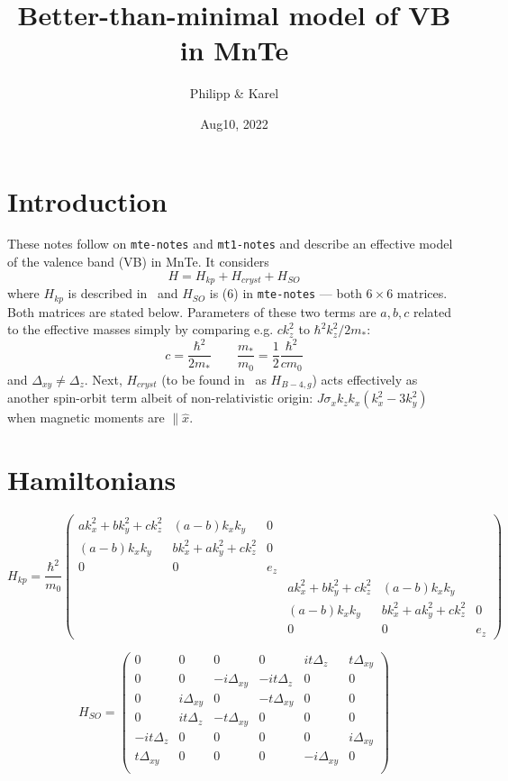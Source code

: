 \documentclass{article}
\title{Better-than-minimal model of VB in MnTe}
\author{Philipp \& Karel}
\date{Aug10, 2022}
\begin{document}
\maketitle

\section*{Introduction}

These notes follow on {\tt mte-notes} and {\tt mt1-notes} and describe
an effective model of the valence band (VB) in MnTe. It considers
%
\begin{equation}
  H=H_{kp}+H_{cryst}+H_{SO}
\label{eq-01}
\end{equation}
%
where $H_{kp}$ is described in~\cite{PFjr} and $H_{SO}$ is (6) in
{\tt mte-notes} --- both $6\times 6$ matrices. Both matrices are stated below. Parameters of these two
terms are $a,b,c$ related to the effective masses simply by comparing
e.g. $ck_z^2$ to $\hbar^2 k_z^2/2m_*$:
%
\begin{equation}
  c=\frac{\hbar^2}{2m_*}\qquad \frac{m_*}{m_0}={\textstyle{\frac12}} \frac{\hbar^2}{cm_0}
  \label{eq-02}
\end{equation}  
%
and $\Delta_{xy}\not=\Delta_z$. Next, $H_{cryst}$ (to be found in~\cite{LandT}
as $H_{B-4,g}$) acts effectively as another spin-orbit term albeit of
non-relativistic origin: $J\sigma_x k_zk_x(k_x^2-3k_y^2)$ when magnetic
moments are $\parallel \hat{x}$. 

\section*{Hamiltonians}
$$ H_{kp} = \frac{\hbar^2}{m_0} \begin{pmatrix}
	a k_x^2 + b k_y^2 + c k_z^2 & (a-b) k_x k_y & 0 & & &\\
	(a-b) k_x k_y & b k_x^2 + a k_y^2 + c k_z^2 & 0 & & & \\
	0 & 0 & e_z & & & \\
	& & & a k_x^2 + b k_y^2 + c k_z^2 & (a-b) k_x k_y \\
	& & & (a-b) k_x k_y & b k_x^2 + a k_y^2 + c k_z^2 & 0 \\
	& & & 0 & 0 & e_z
\end{pmatrix}$$

$$ H_{SO} = \begin{pmatrix} 
0 & 0 & 0 & 0 & it\Delta_z & t \Delta_{xy} \\
0 & 0 & -i \Delta_{xy} & -it\Delta_z & 0 & 0 \\
0 & i \Delta_{xy} & 0 & -t \Delta_{xy} & 0 & 0 \\
0 & it\Delta_z & -t \Delta_{xy} & 0 & 0 & 0 \\
-it\Delta_z & 0 & 0 & 0 & 0 & i \Delta_{xy} \\
t \Delta_{xy} & 0 & 0 & 0 & -i \Delta_{xy} & 0 \\
\end{pmatrix}$$
\end{document}
